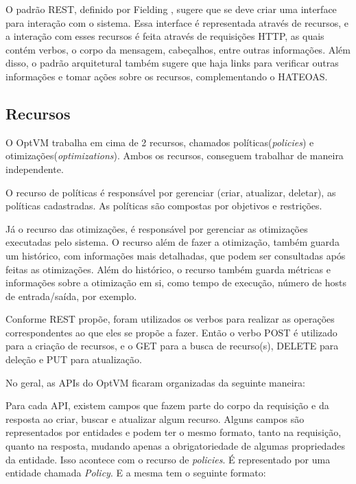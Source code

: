 O padrão REST, definido por Fielding \cite{fielding}, sugere que se deve criar uma interface para interação com o sistema. 
Essa interface é representada através de recursos, e a interação com esses recursos é feita através de requisições HTTP, 
as quais contém verbos, o corpo da mensagem, cabeçalhos, entre outras informações. Além disso, o padrão arquitetural também sugere que 
haja links para verificar outras informações e tomar ações sobre os recursos, complementando o HATEOAS.

\subsection{Recursos}

O OptVM trabalha em cima de 2 recursos, chamados políticas(\textit{policies}) e otimizações(\textit{optimizations}). 
Ambos os recursos, conseguem trabalhar de maneira independente.

O recurso de políticas é responsável por gerenciar (criar, atualizar, deletar), as políticas
cadastradas. As políticas são compostas por objetivos e restrições. 

Já o recurso das otimizações, é responsável por gerenciar as otimizações executadas pelo sistema. O recurso 
além de fazer a otimização, também guarda um histórico, com informações mais detalhadas, 
que podem ser consultadas após feitas as otimizações. Além do histórico, o recurso também guarda métricas e informações sobre
a otimização em si, como tempo de execução, número de hosts de entrada/saída, por exemplo.

Conforme REST propõe, foram utilizados os verbos para realizar as operações correspondentes
ao que eles se propõe a fazer. Então o verbo POST é utilizado para a criação de recursos,
e o GET para a busca de recurso(s), DELETE para deleção e PUT para atualização.

No geral, as APIs do OptVM ficaram organizadas da seguinte maneira:





Para cada API, existem campos que fazem parte do corpo da requisição e da resposta
ao criar, buscar e atualizar algum recurso. Alguns campos são representados por entidades e 
podem ter o mesmo formato, tanto na requisição, quanto na resposta, mudando apenas
a obrigatoriedade de algumas propriedades da entidade. Isso acontece
com o recurso de \textit{policies}. É representado por uma entidade chamada \textit{Policy}.
E a mesma tem o seguinte formato:

